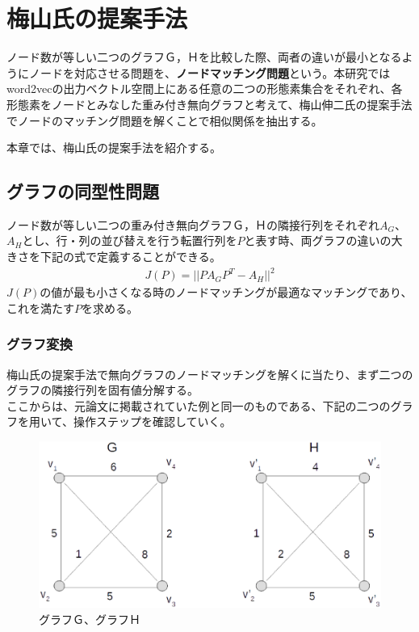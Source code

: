 \chapter{梅山氏の提案手法}
ノード数が等しい二つのグラフＧ，Ｈを比較した際、両者の違いが最小となるようにノードを対応させる問題を、\textbf{ノードマッチング問題}という。本研究ではword2vecの出力ベクトル空間上にある任意の二つの形態素集合をそれぞれ、各形態素をノードとみなした重み付き無向グラフと考えて、梅山伸二氏の提案手法\cite{s_umeyama}でノードのマッチング問題を解くことで相似関係を抽出する。

本章では、梅山氏の提案手法を紹介する。\cite{s_umeyama}

\section{グラフの同型性問題}
ノード数が等しい二つの重み付き無向グラフＧ，Ｈの隣接行列をそれぞれ$A_G$、$A_H$とし、行・列の並び替えを行う転置行列を$P$と表す時、両グラフの違いの大きさを下記の式で定義することができる。
\begin{eqnarray}
  \label{jp_p2}
  J(P)=||PA_GP^T-A_H||^2
\end{eqnarray}
$J(P)$の値が最も小さくなる時のノードマッチングが最適なマッチングであり、これを満たす$P$を求める。

\newpage

\subsection{グラフ変換}
梅山氏の提案手法で無向グラフのノードマッチングを解くに当たり、まず二つのグラフの隣接行列を固有値分解する。\\
ここからは、元論文に掲載されていた例と同一のものである、下記の二つのグラフを用いて、操作ステップを確認していく。
\begin{figure}[h]
  \centering
  \includegraphics[width=12.5cm]{../images/gh.eps}
  \caption{グラフＧ、グラフＨ}
\end{figure}

